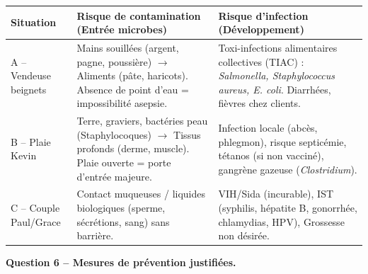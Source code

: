 \documentclass[11pt]{article}
\begin{document}
\begin{exoresolu}
\begin{center}
\begin{tabularx}{\linewidth}{|l|X|X|}\hline
\rowcolor{popblueL}
\textbf{Situation} & \textbf{Risque de contamination (Entrée microbes)} & \textbf{Risque d'infection (Développement)} \\ \hline
A -- Vendeuse beignets & Mains souillées (argent, pagne, poussière) $\to$ Aliments (pâte, haricots). Absence de point d'eau = impossibilité asepsie. & Toxi-infections alimentaires collectives (TIAC) : \emph{Salmonella, Staphylococcus aureus, E. coli}. Diarrhées, fièvres chez clients. \\ \hline
B -- Plaie Kevin & Terre, graviers, bactéries peau (Staphylocoques) $\to$ Tissus profonds (derme, muscle). Plaie ouverte = porte d'entrée majeure. & Infection locale (abcès, phlegmon), risque septicémie, tétanos (si non vacciné), gangrène gazeuse (\emph{Clostridium}). \\ \hline
C -- Couple Paul/Grace & Contact muqueuses / liquides biologiques (sperme, sécrétions, sang) sans barrière. & VIH/Sida (incurable), IST (syphilis, hépatite B, gonorrhée, chlamydias, HPV), Grossesse non désirée. \\ \hline
\end{tabularx}
\end{center}

\textbf{Question 6 -- Mesures de prévention justifiées.}


\end{exoresolu}
\end{document}
